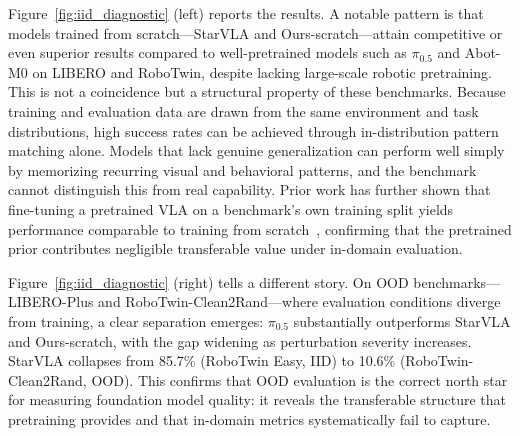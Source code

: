 
Figure~\ref{fig:iid_diagnostic} (left) reports the results. A notable pattern is that models trained from scratch---StarVLA and Ours-scratch---attain competitive or even superior results compared to well-pretrained models such as $\pi_{0.5}$ and Abot-M0 on LIBERO and RoboTwin, despite lacking large-scale robotic pretraining. This is not a coincidence but a structural property of these benchmarks. Because training and evaluation data are drawn from the same environment and task distributions, high success rates can be achieved through in-distribution pattern matching alone. Models that lack genuine generalization can perform well simply by memorizing recurring visual and behavioral patterns, and the benchmark cannot distinguish this from real capability. Prior work has further shown that fine-tuning a pretrained VLA on a benchmark's own training split yields performance comparable to training from scratch~\citep{Yan_2025_ICCV}, confirming that the pretrained prior contributes negligible transferable value under in-domain evaluation.

Figure~\ref{fig:iid_diagnostic} (right) tells a different story. On OOD benchmarks---LIBERO-Plus and RoboTwin-Clean2Rand---where evaluation conditions diverge from training, a clear separation emerges: $\pi_{0.5}$ substantially outperforms StarVLA and Ours-scratch, with the gap widening as perturbation severity increases. StarVLA collapses from 85.7\% (RoboTwin Easy, IID) to 10.6\% (RoboTwin-Clean2Rand, OOD). This confirms that OOD evaluation is the correct north star for measuring foundation model quality: it reveals the transferable structure that pretraining provides and that in-domain metrics systematically fail to capture.

